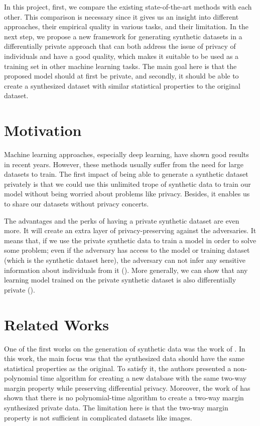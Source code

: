 \documentclass{article}
\begin{document}
In this project, first, we compare the existing state-of-the-art methods with each other. This comparison is necessary since it gives us an insight into different approaches, their empirical quality in various tasks, and their limitation. In the next step, we propose a new framework for generating synthetic datasets in a differentially private approach that can both address the issue of privacy of individuals and have a good quality, which makes it suitable to be used as a training set in other machine learning tasks. The main goal here is that the proposed model should at first be private, and secondly, it should be able to create a synthesized dataset with similar statistical properties to the original dataset.


\section{Motivation}

Machine learning approaches, especially deep learning, have shown good results in recent years. However, these methods usually suffer from the need for large datasets to train. The first impact of being able to generate a synthetic dataset privately is that we could use this unlimited trope of synthetic data to train our model without being worried about problems like privacy. Besides, it enables us to share our datasets without privacy concerts.

The advantages and the perks of having a private synthetic dataset are even more. It will create an extra layer of privacy-preserving against the adversaries. It means that, if we use the private synthetic data to train a model in order to solve some problem; even if the adversary has access to the model or training dataset (which is the synthetic dataset here), the adversary can not infer any sensitive information about individuals from it (\cite{chen2018differentially}). More generally, we can show that any learning model trained on the private synthetic dataset is also differentially private (\cite{chen2018differentially}).


\section{Related Works}

One of the first works on the generation of synthetic data was the work of \cite{barak2007privacy}. In this work, the main focus was that the synthesized data should have the same statistical properties as the original. To satisfy it, the authors presented a non-polynomial time algorithm for creating a new database with the same two-way margin property while preserving differential privacy. Moreover, the work of \cite{ullman2011pcps} has shown that there is no polynomial-time algorithm to create a two-way margin synthesized private data. The limitation here is that the two-way margin property is not sufficient in complicated datasets like images.
\end{document}
